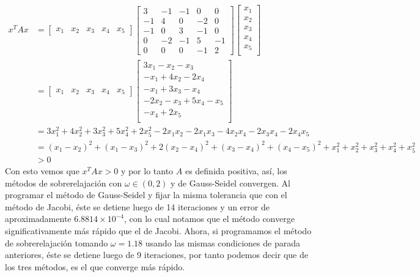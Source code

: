 \begin{enumerate}
\begin{solution}
    \begin{align*}
        x^TAx&=\begin{bmatrix}
            x_1 & x_2 & x_3 & x_4 & x_5 
        \end{bmatrix} \begin{bmatrix}
            3 & -1 & -1 & 0 & 0 \\
            -1 & 4 & 0 & -2 & 0 \\ 
            -1 & 0 & 3 & -1 & 0 \\
            0 & -2 & -1 & 5 & -1 \\
            0 & 0 & 0 & -1 & 2
        \end{bmatrix}\begin{bmatrix}
            x_1\\
            x_2\\ 
            x_3\\
            x_4\\ 
            x_5\\ 
            \end{bmatrix}\\
            &= \begin{bmatrix}
            x_1 & x_2 & x_3 & x_4 & x_5
            \end{bmatrix} \begin{bmatrix}
            3x_1 - x_2 - x_3 \\ 
            -x_1 + 4x_2 -2x_4 \\ 
            -x_1 +3x_3 -x_4 \\ 
            -2x_2 - x_3  + 5x_4 - x_5 \\ 
            -x_4 + 2x_5\\ 
            \end{bmatrix}\\ 
            &= 3x_1^2 + 4x_2^2 + 3x_3^2 + 5x_4^2 + 2x_5^2 -2x_1x_2 -2x_1x_3 - 4x_2x_4 -2x_3x_4 - 2x_4x_5\\
            &= (x_1 - x_2)^2 + (x_1 - x_3)^2 + 2(x_2 - x_4)^2 + (x_3 - x_4)^2 + (x_4 - x_5)^2 + x_1^2 + x_2^2 + x_3^2 + x_4^2 + x_5^2 \\ 
            & > 0
    \end{align*}
    Con esto vemos que $x^TAx > 0$ y por lo tanto $A$ es definida positiva, así, los métodos de sobrerelajación con $\omega \in (0,2)$ y de Gauss-Seidel convergen. 
    Al programar el método de Gauss-Seidel y fijar la misma tolerancia que con el método de Jacobi, éste se detiene luego de 14 iteraciones y un error de aproximadamente $6.8814 \times 10^{-4}$, con lo cual notamos que el método converge significativamente más rápido que el de Jacobi. 
    Ahora, si programamos el método de sobrerelajación tomando $\omega = 1.18$ usando las mismas condiciones de parada anteriores, éste se detiene luego de 9 iteraciones, por tanto podemos decir que de los tres métodos, es el que converge más rápido. 
    \end{solution}


\end{enumerate}
